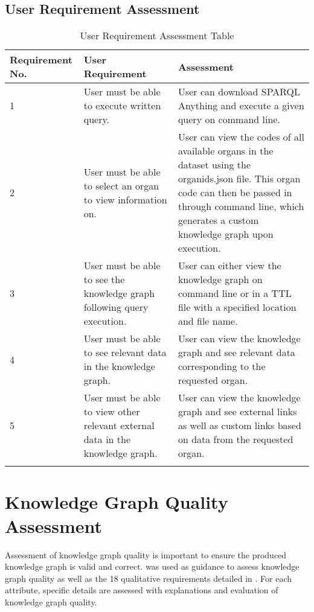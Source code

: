 \subsection{User Requirement Assessment}

\begin{longtable}{|p{2.25cm}|p{4.5cm}|p{6.5cm}|}
\hline
\textbf{Requirement No.} & \textbf{User Requirement} & \textbf{Assessment}\\
\hline

1& 
User must be able to execute written query. &
User can download SPARQL Anything \cite{sparqlanythinggithub} and execute a given query on command line. \\
\hline

2&
User must be able to select an organ to view information on. &
User can view the codes of all available organs in the dataset using the organids.json file. This organ code can then be passed in through command line, which generates a custom knowledge graph upon execution. \\
\hline

3&
User must be able to see the knowledge graph following query execution. &
User can either view the knowledge graph on command line or in a TTL file with a specified location and file name. \\
\hline

4&
User must be able to see relevant data in the knowledge graph. &
User can view the knowledge graph and see relevant data corresponding to the requested organ. \\
\hline

5&
User must be able to view other relevant external data in the knowledge graph. &
User can view the knowledge graph and see external links as well as custom links based on data from the requested organ. \\ 
\hline

\caption{User Requirement Assessment Table}
\end{longtable}
\vspace{-1.1cm}

\section{Knowledge Graph Quality Assessment}
\hspace{0.5cm} Assessment of knowledge graph quality is important to ensure the produced knowledge graph is valid and correct. \cite{knowledgegraphevaulationbook} was used as guidance to assess knowledge graph quality as well as the 18 qualitative requirements detailed in \cite{evaluationpaper}. For each attribute, specific details are assessed with explanations and evaluation of knowledge graph quality. 

